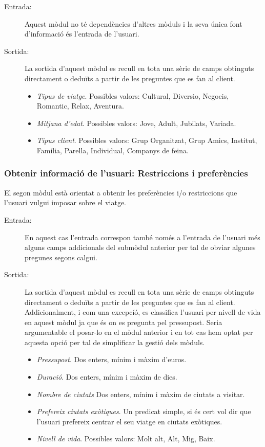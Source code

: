 \documentclass[11pt,a4paper]{article}
\begin{document}
\begin{description}
	\item[Entrada:] Aquest mòdul no té dependències d'altres mòduls i la seva única font d'informació és l'entrada de l'usuari. 

	\item[Sortida:] La sortida d'aquest mòdul es recull en tota una sèrie de camps obtinguts directament o deduïts a partir de les preguntes que es fan al client.
	\begin{itemize}
	\item \emph{Tipus de viatge}. Possibles valors: Cultural, Diversio, Negocis, Romantic, Relax, Aventura.
	\item \emph{Mitjana d'edat}. Possibles valors: Jove, Adult, Jubilats, Variada.
	\item \emph{Tipus client}. Possibles valors: Grup Organitzat, Grup Amics, Institut, Familia, Parella, Individual, Companys de feina.
	\end{itemize}

\end{description}

\subsubsection*{Obtenir informació de l'usuari: Restriccions i preferències}

El segon mòdul està orientat a obtenir les preferències i/o restriccions que l'usuari vulgui imposar sobre el viatge.

\begin{description}
	\item[Entrada:] En aquest cas l'entrada correspon també només a l'entrada de l'usuari més alguns camps addicionals del submòdul anterior per tal de obviar algunes pregunes segons calgui.

	\item[Sortida:] La sortida d'aquest mòdul es recull en tota una sèrie de camps obtinguts directament o deduïts a partir de les preguntes que es fan al client. Addicionalment, i com una excepcíó, es classifica l'usuari per nivell de vida en aquest mòdul ja que és on es pregunta pel pressupost. Seria argumentable el posar-lo en el mòdul anterior i en tot cas hem optat per aquesta opció per tal de simplificar la gestió dels mòduls.
	\begin{itemize}
	\item \emph{Pressupost}. Dos enters, mínim i màxim d'euros.
	\item \emph{Duració}. Dos enters, mínim i màxim de dies.
	\item \emph{Nombre de ciutats} Dos enters, mínim i màxim de ciutats a visitar.
	\item \emph{Prefereix ciutats exòtiques}. Un predicat simple, si és cert vol dir que l'usuari prefereix centrar el seu viatge en ciutats exòtiques.
	\item \emph{Nivell de vida}. Possibles valors: Molt alt, Alt, Mig, Baix.
	\end{itemize}

\end{description}
\end{document}

